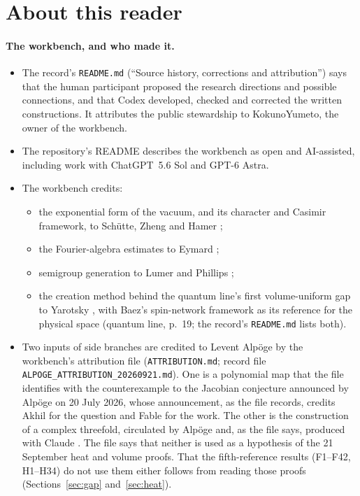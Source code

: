 \begin{abstract}
All results hold at fixed lattice spacing and strong bare coupling. The workbench does not claim a continuum mass gap, and nothing here bears on that problem.
\end{abstract}

\section*{About this reader}\label{sec:about}

\paragraph{The workbench, and who made it.}
\begin{itemize}
\item The record's \texttt{README.md} (``Source history, corrections and attribution'') says that the human participant proposed the research directions and possible connections, and that Codex developed, checked and corrected the written constructions. It attributes the public stewardship to KokunoYumeto, the owner of the workbench.
\item The repository's README describes the workbench as open and AI-assisted, including work with ChatGPT~5.6 Sol and GPT-6 Astra.
\item The workbench credits:
\begin{itemize}
\item the exponential form of the vacuum, and its character and Casimir framework, to Schütte, Zheng and Hamer \cite{SchutteZhengHamer};
\item the Fourier-algebra estimates to Eymard \cite{Eymard};
\item semigroup generation to Lumer and Phillips \cite{LumerPhillips};
\item the creation method behind the quantum line's first volume-uniform gap to Yarotsky \cite{Yarotsky}, with Baez's spin-network framework \cite{Baez} as its reference for the physical space (quantum line, p.~19; the record's \texttt{README.md} lists both).
\end{itemize}
\item Two inputs of side branches are credited to Levent Alpöge by the workbench's attribution file (\texttt{ATTRIBUTION.md}; record file \texttt{ALPOGE\_ATTRIBUTION\_20260921.md}). One is a polynomial map that the file identifies with the counterexample to the Jacobian conjecture announced by Alpöge on 20 July 2026, whose announcement, as the file records, credits Akhil for the question and Fable for the work. The other is the construction of a complex threefold, circulated by Alpöge and, as the file says, produced with Claude \cite{AlpogeS6}. The file says that neither is used as a hypothesis of the 21 September heat and volume proofs. That the fifth-reference results (F1--F42, H1--H34) do not use them either follows from reading those proofs (Sections~\ref{sec:gap} and~\ref{sec:heat}).

\end{itemize}
